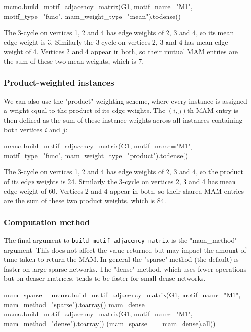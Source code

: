\documentclass{article}
\begin{document}
\begin{pyconsole}
mcmo.build_motif_adjacency_matrix(G1, motif_name="M1",
  motif_type="func", mam_weight_type="mean").todense()
\end{pyconsole}

The 3-cycle on vertices 1, 2 and 4
has edge weights of 2, 3 and 4, so its mean edge weight is 3.
Similarly the 3-cycle on vertices 2, 3 and 4 has mean edge weight of 4.
Vertices 2 and 4 appear in both, so their mutual MAM entries are the
sum of these two mean weights, which is 7.

\subsubsection{Product-weighted instances}

We can also use the "product" weighting scheme,
where every instance is assigned a weight equal to the
product of its edge weights.
The $(i,j)$th MAM entry is then defined as the sum of these
instance weights across all instances containing
both vertices $i$ and $j$:

\begin{pyconsole}
mcmo.build_motif_adjacency_matrix(G1, motif_name="M1",
  motif_type="func", mam_weight_type="product").todense()
\end{pyconsole}

The 3-cycle on vertices 1, 2 and 4
has edge weights of 2, 3 and 4, so the product of its edge weights is 24.
Similarly the 3-cycle on vertices 2, 3 and 4 has mean edge weight of 60.
Vertices 2 and 4 appear in both, so their shared MAM entries are the
sum of these two product weights, which is 84.

\subsubsection{Computation method}

The final argument to \texttt{build\_motif\_adjacency\_matrix}
is the "mam\_method" argument.
This does not affect the value returned but may impact the
amount of time taken to return the MAM.
In general the "sparse" method (the default)
is faster on large sparse networks.
The "dense" method, which uses fewer operations but on
denser matrices, tends to be faster for small dense networks.


\begin{pyconsole}
mam_sparse = mcmo.build_motif_adjacency_matrix(G1, motif_name="M1",
  mam_method="sparse").toarray()
mam_dense  = mcmo.build_motif_adjacency_matrix(G1, motif_name="M1",
  mam_method="dense").toarray()
(mam_sparse == mam_dense).all()
\end{pyconsole}
\end{document}
